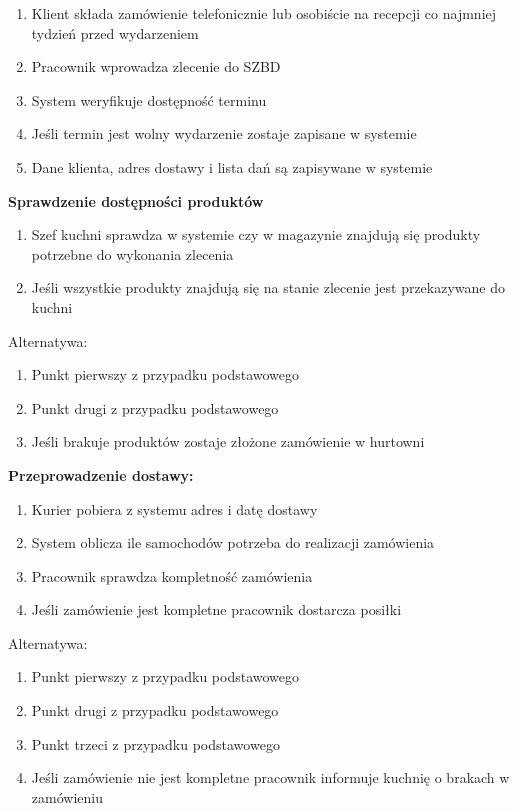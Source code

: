 \documentclass[10pt]{article}
\begin{document}
\begin{enumerate}
    \item Klient składa zamówienie telefonicznie lub osobiście na recepcji co najmniej tydzień przed wydarzeniem
    \item Pracownik wprowadza zlecenie do SZBD
    \item System weryfikuje dostępność terminu
    \item Jeśli termin jest wolny wydarzenie zostaje zapisane w systemie
    \item Dane klienta, adres dostawy i lista dań są zapisywane w systemie
\end{enumerate}

\textbf{Sprawdzenie dostępności produktów}

\begin{enumerate}
    \item Szef kuchni sprawdza w systemie czy w magazynie znajdują się produkty potrzebne do wykonania zlecenia
    \item Jeśli wszystkie produkty znajdują się na stanie zlecenie jest przekazywane do kuchni
\end{enumerate}

Alternatywa:
\begin{enumerate}
    \item Punkt pierwszy z przypadku podstawowego
    \item Punkt drugi z przypadku podstawowego
    \item Jeśli brakuje produktów zostaje złożone zamówienie w hurtowni
\end{enumerate}

\textbf{Przeprowadzenie dostawy:}
\begin{enumerate}
    \item Kurier pobiera z systemu adres i datę dostawy
    \item System oblicza ile samochodów potrzeba do realizacji zamówienia
    \item Pracownik sprawdza kompletność zamówienia
    \item Jeśli zamówienie jest kompletne pracownik dostarcza posiłki
\end{enumerate}

Alternatywa:
\begin{enumerate}
    \item Punkt pierwszy z przypadku podstawowego
    \item Punkt drugi z przypadku podstawowego
    \item Punkt trzeci z przypadku podstawowego
    \item Jeśli zamówienie nie jest kompletne pracownik informuje kuchnię o brakach w zamówieniu
\end{enumerate}
\end{document}

